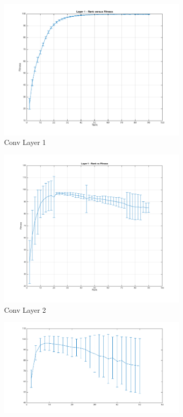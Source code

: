 \begin{figure}[!htb]
  \centering
  \begin{subfigure}[h]{0.40\textwidth}
   \includegraphics[width=\textwidth]{images/Layer1ImageNet.png}
    \caption{Conv Layer 1}
  \end{subfigure}
  \begin{subfigure}[h]{0.40\textwidth}
    \includegraphics[width=\textwidth]{images/Layer2ImageNet.png}
    \caption{Conv Layer 2}
  \end{subfigure}
  \begin{subfigure}[h]{0.40\textwidth}
   \includegraphics[width=\textwidth]{images/Layer3ImageNet.png}

\end{subfigure}
\end{figure}
